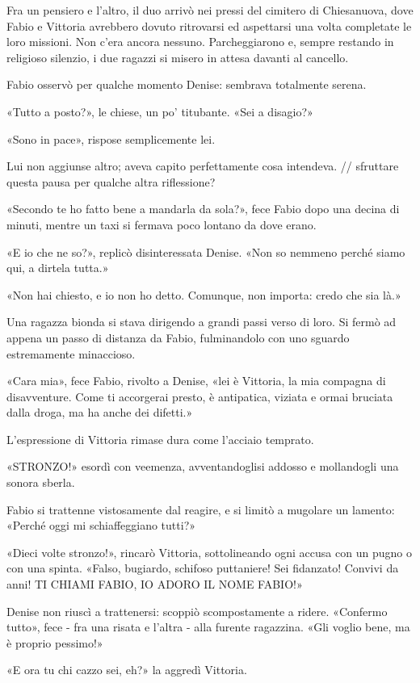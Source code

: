 Fra un pensiero e l'altro, il duo arrivò nei pressi del cimitero di Chiesanuova, dove Fabio e Vittoria avrebbero dovuto ritrovarsi ed aspettarsi una volta completate le loro missioni. Non c'era ancora nessuno. Parcheggiarono e, sempre restando in religioso silenzio, i due ragazzi si misero in attesa davanti al cancello.

Fabio osservò per qualche momento Denise: sembrava totalmente serena.

«Tutto a posto?», le chiese, un po' titubante. «Sei a disagio?»

«Sono in pace», rispose semplicemente lei.

Lui non aggiunse altro; aveva capito perfettamente cosa intendeva.
// sfruttare questa pausa per qualche altra riflessione?

«Secondo te ho fatto bene a mandarla da sola?», fece Fabio dopo una decina di minuti, mentre un taxi si fermava poco lontano da dove erano.

«E io che ne so?», replicò disinteressata Denise. «Non so nemmeno perché siamo qui, a dirtela tutta.»

«Non hai chiesto, e io non ho detto. Comunque, non importa: credo che sia là.»

Una ragazza bionda si stava dirigendo a grandi passi verso di loro. Si fermò ad appena un passo di distanza da Fabio, fulminandolo con uno sguardo estremamente minaccioso.

«Cara mia», fece Fabio, rivolto a Denise, «lei è Vittoria, la mia compagna di disavventure. Come ti accorgerai presto, è antipatica, viziata e ormai bruciata dalla droga, ma ha anche dei difetti.»

L'espressione di Vittoria rimase dura come l'acciaio temprato.

«STRONZO!» esordì con veemenza, avventandoglisi addosso e mollandogli una sonora sberla.

Fabio si trattenne vistosamente dal reagire, e si limitò a mugolare un lamento: «Perché oggi mi schiaffeggiano tutti?»

«Dieci volte stronzo!», rincarò Vittoria, sottolineando ogni accusa con un pugno o con una spinta. «Falso, bugiardo, schifoso puttaniere! Sei fidanzato! Convivi da anni! TI CHIAMI FABIO, IO ADORO IL NOME FABIO!»

Denise non riuscì a trattenersi: scoppiò scompostamente a ridere. «Confermo tutto», fece - fra una risata e l'altra - alla furente ragazzina. «Gli voglio bene, ma è proprio pessimo!»

«E ora tu chi cazzo sei, eh?» la aggredì Vittoria.

